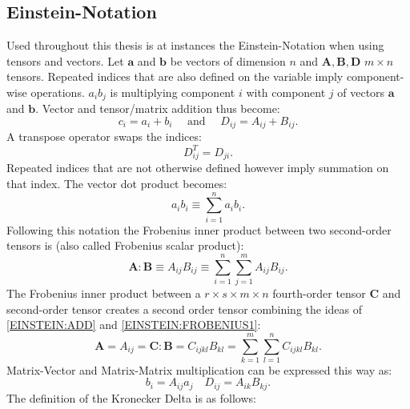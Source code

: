 \documentclass[m,times]{cgMA}
\begin{document}
\subsection{Einstein-Notation}
Used throughout this thesis is at instances the Einstein-Notation when using tensors and vectors. Let $\boldsymbol{a}$ and $\boldsymbol{b}$ be vectors of dimension $n$ and  $\boldsymbol{A,B,D}$ $ { m \times n }$ tensors. Repeated indices that are also defined on the variable imply component-wise operations.
$a _ { i } b _ { j }$ is multiplying component $i$ with component $j$ of vectors $\boldsymbol{a}$ and $\boldsymbol{b}$. Vector and tensor/matrix addition thus become:
\begin{equation} \label{EINSTEIN:ADD}
  c _ { i } = a _ { i } + b _ { i } \quad \text { and } \quad D _ { i j } = A _ { i j } + B _ { i j }.
\end{equation}
A transpose operator swaps the indices:
\begin{equation}
  D^T _ { i j }  =D_{ji}.
\end{equation}
Repeated indices that are not otherwise defined however imply summation on that index. The vector dot product becomes:
\begin{equation}
  a _ { i } b _ { i } \equiv \sum _ { i = 1 } ^ { n } a _ { i } b _ { i }.
\end{equation}
Following this notation the Frobenius inner product between two second-order tensors is (also called Frobenius scalar product):
\begin{equation} \label{EINSTEIN:FROBENIUS1}
  \boldsymbol { A } : \boldsymbol { B } \equiv A _ { i j } B _ { i j } \equiv \sum _ { i = 1 } ^ { n } \sum _ { j = 1 } ^ { m } A _ { ij } B _ { ij }.
\end{equation}
The Frobenius inner product between a ${r \times s \times m \times n }$ fourth-order tensor $\boldsymbol{C}$  and second-order tensor creates a second order tensor combining the ideas of \ref{EINSTEIN:ADD} and \ref{EINSTEIN:FROBENIUS1}:
\begin{equation}
  \boldsymbol { A } = A_ {ij} =  \boldsymbol {C} : \boldsymbol { B } = C _ {i j k l} B _ { k l  } = \sum _ { k = 1 } ^ { m } \sum _ { l = 1 } ^ { n } C _ { ijkl } B _ { kl }.
\end{equation}
Matrix-Vector and Matrix-Matrix multiplication can be expressed this way as:
\begin{equation}
  b_i = A_{i j} a_j \quad D _ { i j } = A _ { i k } B _ { k j }.
\end{equation}
The definition of the Kronecker Delta is as follows:
\end{document}

